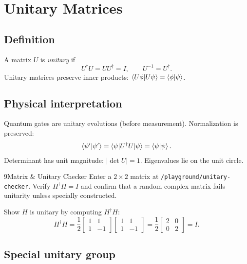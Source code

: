 \section{Unitary Matrices}
\label{sec:unitary}

\subsection{Definition}

A matrix $U$ is \emph{unitary} if
\begin{equation}
U^\dagger U = UU^\dagger = I,\qquad U^{-1}=U^\dagger.
\label{eq:unitary-def}
\end{equation}
Unitary matrices preserve inner products: $\braket{U\phi|U\psi}=\braket{\phi|\psi}$.

\subsection{Physical interpretation}

Quantum gates are unitary evolutions (before measurement). Normalization is preserved:
\begin{equation}
\braket{\psi'|\psi'}=\braket{\psi|U^\dagger U|\psi}=\braket{\psi|\psi}.
\label{eq:norm-preservation}
\end{equation}
Determinant has unit magnitude: $|\det U|=1$. Eigenvalues lie on the unit circle.

\begin{labbox}{9}{Matrix \& Unitary Checker}
Enter a $2\times 2$ matrix at \texttt{/playground/unitary-checker}. Verify $H^\dagger H=I$ and confirm that a random complex matrix fails unitarity unless specially constructed.
\end{labbox}

\begin{example}
Show $H$ is unitary by computing $H^\dagger H$:
\[
H^\dagger H=\frac{1}{2}\begin{bmatrix}1&1\\1&-1\end{bmatrix}\begin{bmatrix}1&1\\1&-1\end{bmatrix}
=\frac{1}{2}\begin{bmatrix}2&0\\0&2\end{bmatrix}=I.
\]
\end{example}

\subsection{Special unitary group}

